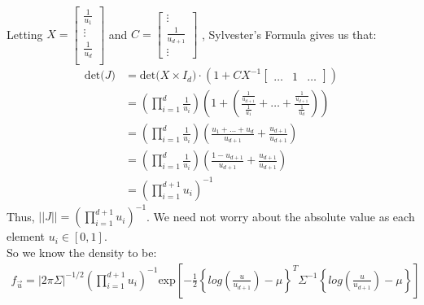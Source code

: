 \documentclass[paper=a4, fontsize=11pt]{scrartcl}
\newcommand{\parens}[1]{ \left( #1 \right) }
\begin{document}
\begin{enumerate}[1.]
\begin{enumerate}[1]
\begin{align*}
        \end{align*}
        Letting $X =  \begin{bmatrix}
                        \frac{1}{u_1} \\
                        \vdots \\
                        \frac{1}{u_d} \\
                      \end{bmatrix}$
        and $C =  \begin{bmatrix}
                    \vdots \\
                    \frac{1}{u_{d+1}} \\
                    \vdots
                  \end{bmatrix}$
        , Sylvester's Formula gives us that:
        \begin{align*}
          \mbox{det(} J \mbox{)}
              &=  \mbox{det(} X\times I_d \mbox{)} \cdot (1 + CX^{-1}\begin{bmatrix} \ldots & 1 & \ldots \end{bmatrix}) \\
              &=  \parens{ \prod_{i = 1}^{d}{\frac{1}{u_{i}}} }
                  \parens{ 1 + \parens{ \frac{\frac{1}{u_{d+1}}}{\frac{1}{u_1}} + \ldots + \frac{\frac{1}{u_{d+1}}}{\frac{1}{u_d}} } } \\
              &=  \parens{ \prod_{i = 1}^{d}{\frac{1}{u_{i}}} }
                  \parens{ \frac{u_1 + \ldots + u_d}{u_{d+1}} + \frac{u_{d+1}}{u_{d+1}} } \\
              &=  \parens{ \prod_{i = 1}^{d}{\frac{1}{u_{i}}} }
                  \parens{ \frac{1 - u_{d+1}}{u_{d+1}} + \frac{u_{d+1}}{u_{d+1}}} \\
              &=  \parens{ \prod_{i = 1}^{d+1}{u_{i}} }^{-1}
        \end{align*}
        Thus, $||J|| = \parens{ \prod_{i = 1}^{d+1}{u_{i}} }^{-1}$. We need not worry about the absolute value as each element $u_i \in [0,1]$. \\

        So we know the density to be:
        \begin{align*}
          f_{\vec{u}} = |2\pi \Sigma|^{-1/2}
                        \parens{ \prod_{i = 1}^{d+1}{u_{i}} }^{-1}
                        \mbox{exp}
                          \left[
                            -\frac{1}{2}
                            \left\{
                              log\parens{ \frac{u}{u_{d+1}}}-\mu \right\}^T\Sigma^{-1}\left\{log\parens{ \frac{u}{u_{d+1}} }-\mu 
                            \right\}
                          \right]
        \end{align*}
    \end{enumerate}
\end{enumerate}
\end{document}
